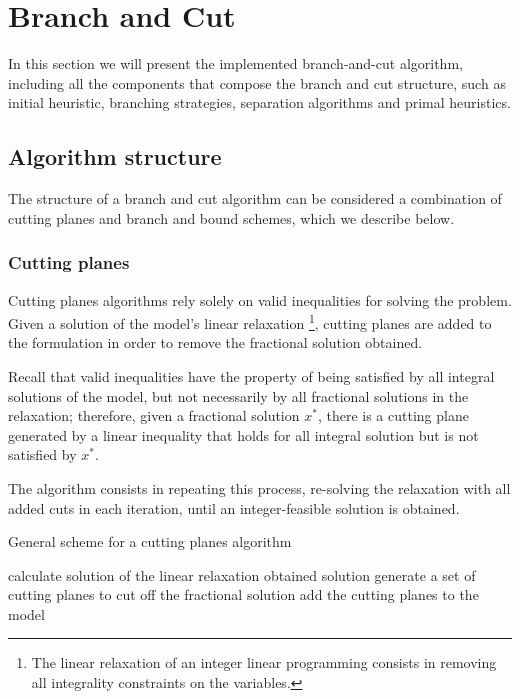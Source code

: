 
\section{Branch and Cut}
\label{sec:bnc}

In this section we will present the implemented branch-and-cut algorithm, including all the components that compose the branch and cut structure, such as initial heuristic, branching strategies, separation algorithms and primal heuristics.

\subsection{Algorithm structure}

The structure of a branch and cut algorithm can be considered a combination of cutting planes and branch and bound schemes, which we describe below.

\subsubsection{Cutting planes}

Cutting planes algorithms rely solely on valid inequalities for solving the problem. Given a solution of the model's linear relaxation \footnote{The linear relaxation of an integer linear programming consists in removing all integrality constraints on the variables.}, cutting planes are added to the formulation in order to remove the fractional solution obtained. 

Recall that valid inequalities have the property of being satisfied by all integral solutions of the model, but not necessarily by all fractional solutions in the relaxation; therefore, given a fractional solution $x^*$, there is a cutting plane generated by a linear inequality that holds for all integral solution but is not satisfied by $x^*$. 

The algorithm consists in repeating this process, re-solving the relaxation with all added cuts in each iteration, until an integer-feasible solution is obtained.

\begin{algorithm}
\caption{General scheme for a cutting planes algorithm}
\label{alg:cuttingplanes}

\begin{algorithmic}

\LOOP
	\STATE calculate solution of the linear relaxation
		\RETURN obtained solution
	\ENDIF
	\STATE generate a set of cutting planes to cut off the fractional solution
	\STATE add the cutting planes to the model
\ENDLOOP

\end{algorithmic}
\end{algorithm}

